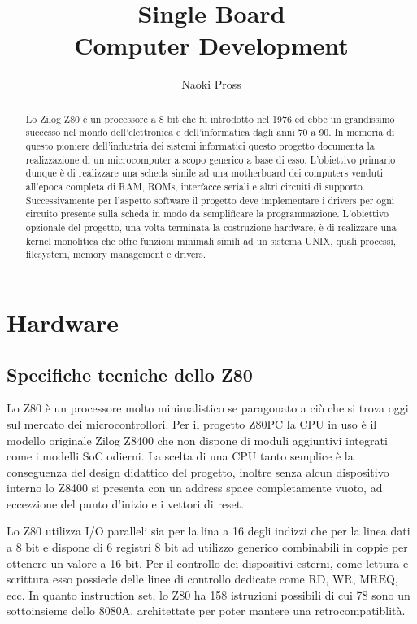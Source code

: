 \documentclass[a4paper, 11pt]{article}
\title{\prj Single Board \\ Computer Development }
\author{Naoki Pross}
\newcommand{\prj}{Z80\textmu PC\xspace}
\newcommand{\inv}[1]{\(\overline{\mbox{#1}}\)}
\begin{document}
\maketitle
\begin{abstract}

    Lo Zilog Z80 \`e un processore a 8 bit che fu introdotto nel 1976 ed ebbe
    un grandissimo successo nel mondo dell'elettronica e dell'informatica
    dagli anni 70 a 90. In memoria di questo pioniere dell'industria dei
    sistemi informatici questo progetto documenta la realizzazione di un
    microcomputer a scopo generico a base di esso. L'obiettivo primario
    dunque \`e di realizzare una scheda simile ad una motherboard dei
    computers venduti all'epoca completa di RAM, ROMs, interfacce seriali e
    altri circuiti di supporto. Successivamente per l'aspetto software il
    progetto deve implementare i drivers per ogni circuito presente sulla
    scheda in modo da semplificare la programmazione. L'obiettivo opzionale
    del progetto, una volta terminata la costruzione hardware, \`e di
    realizzare una kernel monolitica che offre funzioni minimali simili ad un
    sistema UNIX, quali processi, filesystem, memory management e drivers.

\end{abstract}

\break
\section{Hardware}

\subsection{Specifiche tecniche dello Z80}
Lo Z80 \`e un processore molto minimalistico se paragonato a ci\`o che si
trova oggi sul mercato dei microcontrollori. Per il progetto \prj la CPU in
uso \`e il modello originale Zilog Z8400 che non dispone di moduli aggiuntivi
integrati come i modelli SoC odierni. La scelta di una CPU tanto semplice \`e
la conseguenza del design didattico del progetto, inoltre senza alcun
dispositivo interno lo Z8400 si presenta con un address space completamente
vuoto, ad eccezzione del punto d'inizio e i vettori di reset.

Lo Z80 utilizza I/O paralleli sia per la lina a 16 degli indizzi che per la
linea dati a 8 bit e dispone di 6 registri 8 bit ad utilizzo generico
combinabili in coppie per ottenere un valore a 16 bit. Per il controllo dei
dispositivi esterni, come lettura e scrittura esso possiede delle linee di
controllo dedicate come {\tt\inv{RD}}, {\tt\inv{WR}}, {\tt\inv{MREQ}}, ecc. In
quanto instruction set, lo Z80 ha 158 istruzioni possibili di cui 78 sono un
sottoinsieme dello 8080A, architettate per poter mantere una
retrocompatiblit\`a.
\end{document}
